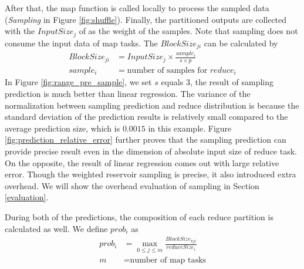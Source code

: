 \ifrevision
\reversemarginpar
{}
\fi
{}
After that, the map function is called locally to process the sampled data (\textit{Sampling} in Figure \ref{fig:shuffle}). 
Finally, the partitioned outputs are collected with the $InputSize_j$ of as the weight of the samples.
Note that sampling does not consume the input data of map tasks. 
The $BlockSize_{ji}$ can be calculated by
\begin{equation}
\label{equationsample}
\begin{aligned}
	BlockSize_{ji} &= {{InputSize_j \times \frac{sample_i}{s \times p}}} \\
	sample_i &= \text{number of samples for $reduce_i$}
\end{aligned}
\end{equation}
In Figure \ref{fig:range_pre_sample}, we set $s$ equals $3$, the result of sampling prediction is much better than linear regression. 
The variance of the normalization between sampling prediction and reduce distribution is because the standard deviation of the prediction results is relatively small compared to the average prediction size, which is $0.0015$ in this example. 
Figure \ref{fig:prediction_relative_error} further proves that the sampling prediction can provide precise result even in the dimension of absolute input size of reduce task. 
On the opposite, the result of linear regression comes out with large relative error. 
Though the weighted reservoir sampling is precise, it also introduced extra overhead. 
We will show the overhead evaluation of sampling in Section \ref{evaluation}.

During both of the predictions, the composition of each reduce partition is calculated as well. We define $prob_i$ as
\begin{equation}
\label{equationprob}
\begin{aligned}
	prob_i &= \max_{0 \leq j \leq m} \frac{BlockSize_{kji}}{reduceSize_i} \\
    m &= \text{number of map tasks}
\end{aligned}
\end{equation}

